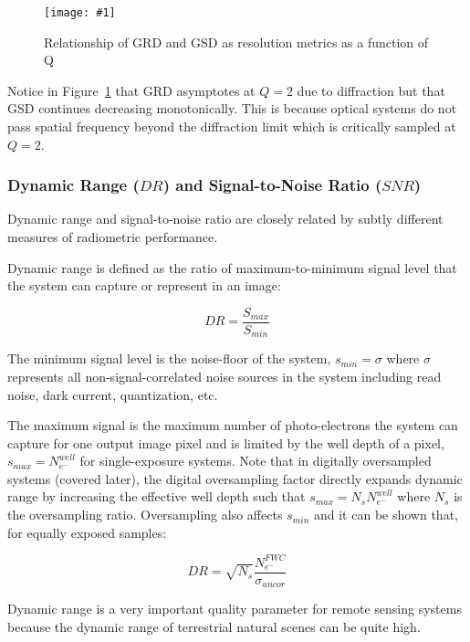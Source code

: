 \documentclass[10pt,journal]{IEEEtran}  %
\newcommand{\includefigure}[3]
{
  \begin{figure}[h!]
  \centering
  \texttt{[image: \#1]}
  \caption[]{#3}
  \label{#2}
  \end{figure}
}
\begin{document}
\includefigure{figures/resolution_q.pgf}{fig:resolution_q}{Relationship of GRD and GSD as resolution metrics as a function of Q}

Notice in Figure~\ref{fig:resolution_q} that GRD asymptotes at $Q=2$ due to diffraction but that GSD continues decreasing monotonically.  This is because optical systems do not pass spatial frequency beyond the diffraction limit which is critically sampled at $Q=2$.

\subsubsection{Dynamic Range ($DR$) and Signal-to-Noise Ratio ($SNR$)}

Dynamic range and signal-to-noise ratio are closely related by subtly different measures of radiometric performance.

Dynamic range is defined as the ratio of maximum-to-minimum signal level that the system can capture or represent in an image:

\begin{equation*}
    DR = \frac{S_{max}}{S_{min}}
\end{equation*}

The minimum signal level is the noise-floor of the system, $s_{min} = \sigma$ where $\sigma$ represents all non-signal-correlated noise sources in the system including read noise, dark current, quantization, etc.

The maximum signal is the maximum number of photo-electrons the system can capture for one output image pixel and is limited by the well depth of a pixel, $s_{max} = N_{e^-}^{well}$ for single-exposure systems.  Note that in digitally oversampled systems (covered later), the digital oversampling factor directly expands dynamic range by increasing the effective well depth such that $s_{max} = N_s N_{e^-}^{well}$ where $N_s$ is the oversampling ratio.  Oversampling also affects $s_{min}$ and it can be shown that, for equally exposed samples:

\begin{equation}
    DR = \sqrt{N_s}\frac{N_{e^-}^{FWC}}{\sigma_{uncor}}
\label{eq:DR_OS}
\end{equation}

Dynamic range is a very important quality parameter for remote sensing systems because the dynamic range of terrestrial natural scenes can be quite high.  
\end{document}
